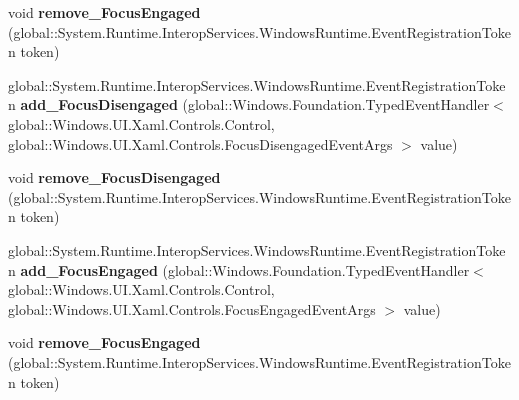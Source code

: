 \begin{DoxyCompactItemize}
\item 
\mbox{\label{interface_windows_1_1_u_i_1_1_xaml_1_1_controls_1_1_i_control4_a382ea6b14878ea7b5e2b4ba178cd1018}} 
void {\bfseries remove\+\_\+\+Focus\+Engaged} (global\+::\+System.\+Runtime.\+Interop\+Services.\+Windows\+Runtime.\+Event\+Registration\+Token token)
\item 
\mbox{\label{interface_windows_1_1_u_i_1_1_xaml_1_1_controls_1_1_i_control4_a680a8edc30b4ba72807571ed0e1513ee}} 
global\+::\+System.\+Runtime.\+Interop\+Services.\+Windows\+Runtime.\+Event\+Registration\+Token {\bfseries add\+\_\+\+Focus\+Disengaged} (global\+::\+Windows.\+Foundation.\+Typed\+Event\+Handler$<$ global\+::\+Windows.\+U\+I.\+Xaml.\+Controls.\+Control, global\+::\+Windows.\+U\+I.\+Xaml.\+Controls.\+Focus\+Disengaged\+Event\+Args $>$ value)
\item 
\mbox{\label{interface_windows_1_1_u_i_1_1_xaml_1_1_controls_1_1_i_control4_ae123018ef2852af850d529f171eb60f3}} 
void {\bfseries remove\+\_\+\+Focus\+Disengaged} (global\+::\+System.\+Runtime.\+Interop\+Services.\+Windows\+Runtime.\+Event\+Registration\+Token token)
\item 
\mbox{\label{interface_windows_1_1_u_i_1_1_xaml_1_1_controls_1_1_i_control4_aace904cbad444f4b1b7a2a18d9a214b9}} 
global\+::\+System.\+Runtime.\+Interop\+Services.\+Windows\+Runtime.\+Event\+Registration\+Token {\bfseries add\+\_\+\+Focus\+Engaged} (global\+::\+Windows.\+Foundation.\+Typed\+Event\+Handler$<$ global\+::\+Windows.\+U\+I.\+Xaml.\+Controls.\+Control, global\+::\+Windows.\+U\+I.\+Xaml.\+Controls.\+Focus\+Engaged\+Event\+Args $>$ value)
\item 
\mbox{\label{interface_windows_1_1_u_i_1_1_xaml_1_1_controls_1_1_i_control4_a382ea6b14878ea7b5e2b4ba178cd1018}} 
void {\bfseries remove\+\_\+\+Focus\+Engaged} (global\+::\+System.\+Runtime.\+Interop\+Services.\+Windows\+Runtime.\+Event\+Registration\+Token token)
\item 
\mbox{\label{interface_windows_1_1_u_i_1_1_xaml_1_1_controls_1_1_i_control4_a680a8edc30b4ba72807571ed0e1513ee}} 

\end{DoxyCompactItemize}
